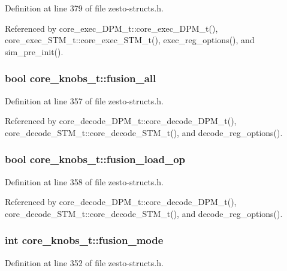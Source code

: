 Definition at line 379 of file zesto-structs.h.

Referenced by core\_\-exec\_\-DPM\_\-t::core\_\-exec\_\-DPM\_\-t(), core\_\-exec\_\-STM\_\-t::core\_\-exec\_\-STM\_\-t(), exec\_\-reg\_\-options(), and sim\_\-pre\_\-init().
\subsubsection[{fusion\_\-all}]{\setlength{\rightskip}{0pt plus 5cm}bool {\bf core\_\-knobs\_\-t::fusion\_\-all}}\label{structcore__knobs__t_2db43f343d1caf41a66b78e6e7c565ff}




Definition at line 357 of file zesto-structs.h.

Referenced by core\_\-decode\_\-DPM\_\-t::core\_\-decode\_\-DPM\_\-t(), core\_\-decode\_\-STM\_\-t::core\_\-decode\_\-STM\_\-t(), and decode\_\-reg\_\-options().
\subsubsection[{fusion\_\-load\_\-op}]{\setlength{\rightskip}{0pt plus 5cm}bool {\bf core\_\-knobs\_\-t::fusion\_\-load\_\-op}}\label{structcore__knobs__t_04019c67216ba2396ceb1bafcdcd3d0d}




Definition at line 358 of file zesto-structs.h.

Referenced by core\_\-decode\_\-DPM\_\-t::core\_\-decode\_\-DPM\_\-t(), core\_\-decode\_\-STM\_\-t::core\_\-decode\_\-STM\_\-t(), and decode\_\-reg\_\-options().
\subsubsection[{fusion\_\-mode}]{\setlength{\rightskip}{0pt plus 5cm}int {\bf core\_\-knobs\_\-t::fusion\_\-mode}}\label{structcore__knobs__t_ccba373a43ac43d703c8ed7e6724acf2}




Definition at line 352 of file zesto-structs.h.

